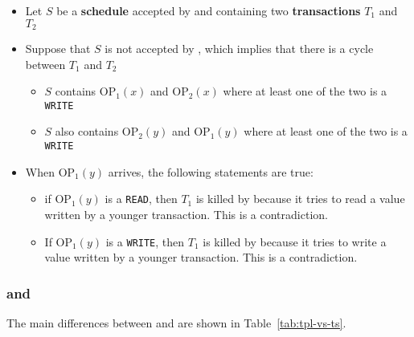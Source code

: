 \documentclass[english]{article}
\begin{document}
\begin{itemize}
  \item Let \(S\) be a \textbf{schedule} accepted by \TS and containing two \textbf{transactions} \(T_1\) and \(T_2\)
  \item Suppose that \(S\) is not accepted by \CSR, which implies that there is a cycle between \(T_1\) and \(T_2\)
        \begin{itemize}
          \item \(S\) contains \(\text{OP}_1(x)\) and \(\text{OP}_2(x)\) where at least one of the two is a \texttt{WRITE}
          \item \(S\) also contains \(\text{OP}_2(y)\) and \(\text{OP}_1(y)\) where at least one of the two is a \texttt{WRITE}
        \end{itemize}
  \item When \(\text{OP}_1(y)\) arrives, the following statements are true:
        \begin{itemize}
          \item if \(\text{OP}_1(y)\) is a \texttt{READ}, then \(T_1\) is killed by \TS because it tries to read a value written by a younger transaction. This is a contradiction.
          \item If \(\text{OP}_1(y)\) is a \texttt{WRITE}, then \(T_1\) is killed by \TS because it tries to write a value written by a younger transaction. This is a contradiction.
        \end{itemize}
\end{itemize}

\subsubsection{\TPL and \TS}

The main differences between \TPL and \TS are shown in Table~\ref{tab:tpl-vs-ts}.

\begin{table}
  \centering
  \bigskip
  \caption{Differences between \TPL and \TS}
  \label{tab:tpl-vs-ts}
  \bigskip
\end{table}
\end{document}
